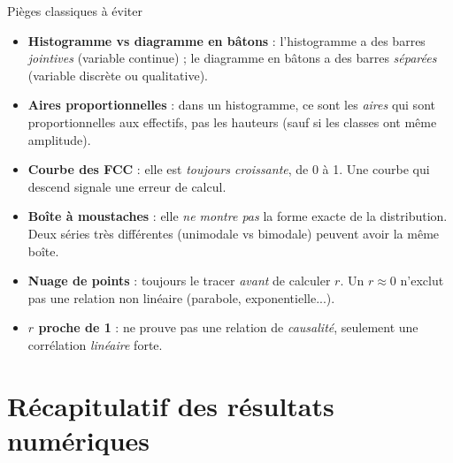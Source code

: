 \documentclass[11pt,a4paper]{article}
\begin{document}
\vspace{0.3cm}

\begin{vignetteAlerte}{Pièges classiques à éviter}
\begin{itemize}[leftmargin=*,itemsep=2pt]
  \item \textbf{Histogramme vs diagramme en bâtons} : l'histogramme a des barres \emph{jointives} (variable continue) ; le diagramme en bâtons a des barres \emph{séparées} (variable discrète ou qualitative).
  \item \textbf{Aires proportionnelles} : dans un histogramme, ce sont les \emph{aires} qui sont proportionnelles aux effectifs, pas les hauteurs (sauf si les classes ont même amplitude).
  \item \textbf{Courbe des FCC} : elle est \emph{toujours croissante}, de 0 à 1. Une courbe qui descend signale une erreur de calcul.
  \item \textbf{Boîte à moustaches} : elle \emph{ne montre pas} la forme exacte de la distribution. Deux séries très différentes (unimodale vs bimodale) peuvent avoir la même boîte.
  \item \textbf{Nuage de points} : toujours le tracer \emph{avant} de calculer $r$. Un $r \approx 0$ n'exclut pas une relation non linéaire (parabole, exponentielle...).
  \item \textbf{$r$ proche de 1} : ne prouve pas une relation de \emph{causalité}, seulement une corrélation \emph{linéaire} forte.
\end{itemize}
\end{vignetteAlerte}

\newpage

\section*{\color{corrige}Récapitulatif des résultats numériques}

\vspace{0.3cm}
\end{document}

